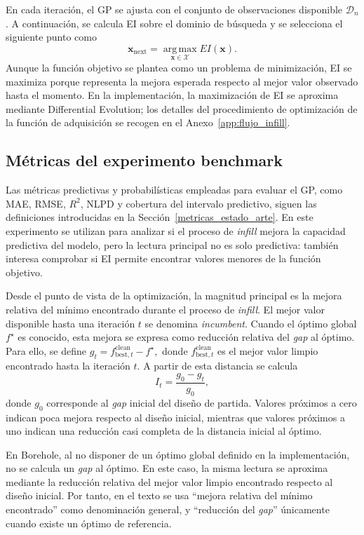 En cada iteración, el GP se ajusta con el conjunto de observaciones disponible \(\mathcal{D}_n\). A continuación, se calcula EI sobre el dominio de búsqueda y se selecciona el siguiente punto como \[\bm{x}_{\mathrm{next}}
    =
    \operatorname*{arg\,max}_{\bm{x}\in\mathcal{X}} EI(\bm{x}).\] Aunque la función objetivo se plantea como un problema de minimización, EI se maximiza porque representa la mejora esperada respecto al mejor valor observado hasta el momento. En la implementación, la maximización de EI se aproxima mediante Differential Evolution; los detalles del procedimiento de optimización de la función de adquisición se recogen en el Anexo~\ref{app:flujo_infill}.

\subsection{Métricas del experimento benchmark}\label{subsubsec:metricas_benchmarks}

Las métricas predictivas y probabilísticas empleadas para evaluar el GP, como MAE, RMSE, \(R^2\), NLPD y cobertura del intervalo predictivo, siguen las definiciones introducidas en la Sección~\ref{metricas_estado_arte}. En este experimento se utilizan para analizar si el proceso de \emph{infill} mejora la capacidad predictiva del modelo, pero la lectura principal no es solo predictiva: también interesa comprobar si EI permite encontrar valores menores de la función objetivo.

Desde el punto de vista de la optimización, la magnitud principal es la mejora relativa del mínimo encontrado durante el proceso de \emph{infill}. El mejor valor disponible hasta una iteración \(t\) se denomina \emph{incumbent}. Cuando el óptimo global \(f^\star\) es conocido, esta mejora se expresa como reducción relativa del \emph{gap} al óptimo. Para ello, se define \(g_t = f_{\mathrm{best},t}^{\mathrm{clean}} - f^\star,\) donde \(f_{\mathrm{best},t}^{\mathrm{clean}}\) es el mejor valor limpio encontrado hasta la iteración \(t\). A partir de esta distancia se calcula \[I_t = \frac{g_0 - g_t}{g_0},\] donde \(g_0\) corresponde al \emph{gap} inicial del diseño de partida. Valores próximos a cero indican poca mejora respecto al diseño inicial, mientras que valores próximos a uno indican una reducción casi completa de la distancia inicial al óptimo.

En Borehole, al no disponer de un óptimo global definido en la implementación, no se calcula un \emph{gap} al óptimo. En este caso, la misma lectura se aproxima mediante la reducción relativa del mejor valor limpio encontrado respecto al diseño inicial. Por tanto, en el texto se usa ``mejora relativa del mínimo encontrado'' como denominación general, y ``reducción del \emph{gap}'' únicamente cuando existe un óptimo de referencia.


